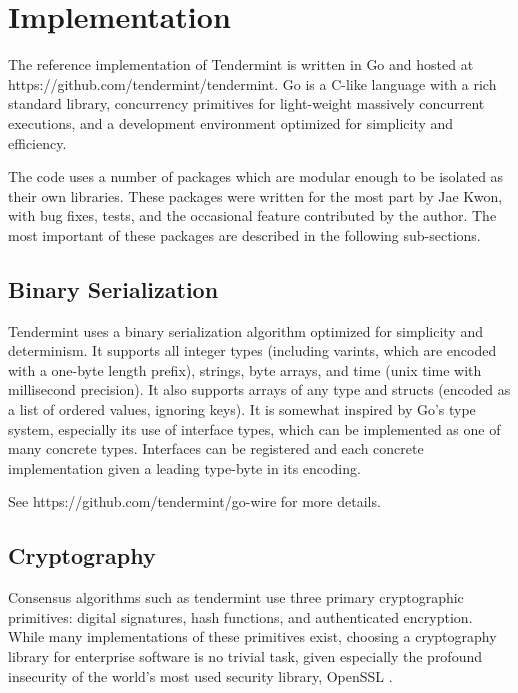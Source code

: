 \chapter{Implementation}
\label{ch:implementation}

The reference implementation of Tendermint is written in Go \cite{golang} and hosted at https://github.com/tendermint/tendermint.
Go is a C-like language with a rich standard library, concurrency primitives for light-weight massively concurrent executions,
and a development environment optimized for simplicity and efficiency.

The code uses a number of packages which are modular enough to be isolated as their own libraries.
These packages were written for the most part by Jae Kwon, with bug fixes, tests, and the occasional feature contributed by the author.
The most important of these packages are described in the following sub-sections.

\section{Binary Serialization}

Tendermint uses a binary serialization algorithm optimized for simplicity and determinism.
It supports all integer types (including varints, which are encoded with a one-byte length prefix),
strings, byte arrays, and time (unix time with millisecond precision).
It also supports arrays of any type and structs (encoded as a list of ordered values, ignoring keys).
It is somewhat inspired by Go's type system, especially its use of interface types, 
which can be implemented as one of many concrete types.
Interfaces can be registered and each concrete implementation given a leading type-byte in its encoding.

See https://github.com/tendermint/go-wire for more details.

\section{Cryptography}

Consensus algorithms such as tendermint use three primary cryptographic primitives: digital signatures, hash functions, and authenticated encryption.
While many implementations of these primitives exist, 
choosing a cryptography library for enterprise software is no trivial task, given especially the profound insecurity of the world's most used security library, OpenSSL \cite{openssl}.

